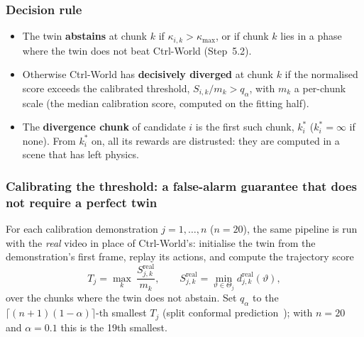 \documentclass[11pt,a4paper]{article}
\theoremstyle{plain}
\theoremstyle{definition}
\theoremstyle{remark}
\begin{document}
\subsubsection{Decision rule}
\begin{itemize}
\item The twin \textbf{abstains} at chunk $k$ if $\kappa_{i,k}>\kappa_{\max}$, or if chunk $k$ lies in a phase where the twin does not beat Ctrl-World (Step~5.2).
\item Otherwise Ctrl-World has \textbf{decisively diverged} at chunk $k$ if the normalised score exceeds the calibrated threshold, $S_{i,k}/m_k>q_\alpha$, with $m_k$ a per-chunk scale (the median calibration score, computed on the fitting half).
\item The \textbf{divergence chunk} of candidate $i$ is the first such chunk, $k^\ast_i$ ($k^\ast_i=\infty$ if none). From $k^\ast_i$ on, all its rewards are distrusted: they are computed in a scene that has left physics.
\end{itemize}

\subsubsection{Calibrating the threshold: a false-alarm guarantee that does not require a perfect twin}
For each calibration demonstration $j=1,\dots,n$ ($n=20$), the same pipeline is run with the \emph{real} video in place of Ctrl-World's: initialise the twin from the demonstration's first frame, replay its actions, and compute the trajectory score
\begin{equation}
T_j=\max_{k}\ \frac{S^{\mathrm{real}}_{j,k}}{m_k},\qquad S^{\mathrm{real}}_{j,k}=\min_{\vartheta\in\Theta_j}d^{\mathrm{real}}_{j,k}(\vartheta),
\end{equation}
over the chunks where the twin does not abstain. Set $q_\alpha$ to the $\lceil(n+1)(1-\alpha)\rceil$-th smallest $T_j$ (split conformal prediction~\cite{lei2018,angelopoulos}); with $n=20$ and $\alpha=0.1$ this is the 19th smallest.
\end{document}
